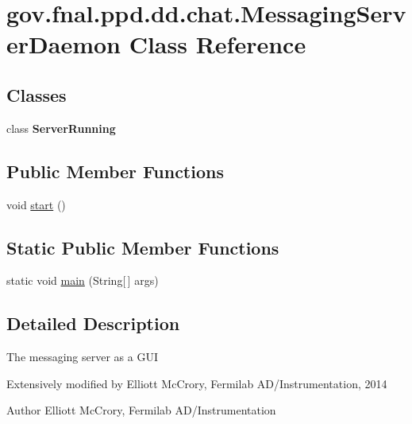 \hypertarget{classgov_1_1fnal_1_1ppd_1_1dd_1_1chat_1_1MessagingServerDaemon}{\section{gov.\-fnal.\-ppd.\-dd.\-chat.\-Messaging\-Server\-Daemon Class Reference}
\label{classgov_1_1fnal_1_1ppd_1_1dd_1_1chat_1_1MessagingServerDaemon}
}
\subsection*{Classes}
\begin{DoxyCompactItemize}
\item 
class {\bfseries Server\-Running}
\end{DoxyCompactItemize}
\subsection*{Public Member Functions}
\begin{DoxyCompactItemize}
\item 
void \hyperlink{classgov_1_1fnal_1_1ppd_1_1dd_1_1chat_1_1MessagingServerDaemon_a00cbd9c8eec08febc8d4c8baba8bf5fd}{start} ()
\end{DoxyCompactItemize}
\subsection*{Static Public Member Functions}
\begin{DoxyCompactItemize}
\item 
static void \hyperlink{classgov_1_1fnal_1_1ppd_1_1dd_1_1chat_1_1MessagingServerDaemon_a00c5f81d7957dbba0fe6ef52b10d21f0}{main} (String\mbox{[}$\,$\mbox{]} args)
\end{DoxyCompactItemize}


\subsection{Detailed Description}
The messaging server as a G\-U\-I 

Extensively modified by Elliott Mc\-Crory, Fermilab A\-D/\-Instrumentation, 2014 

\begin{DoxyAuthor}{Author}
Elliott Mc\-Crory, Fermilab A\-D/\-Instrumentation 
\end{DoxyAuthor}


